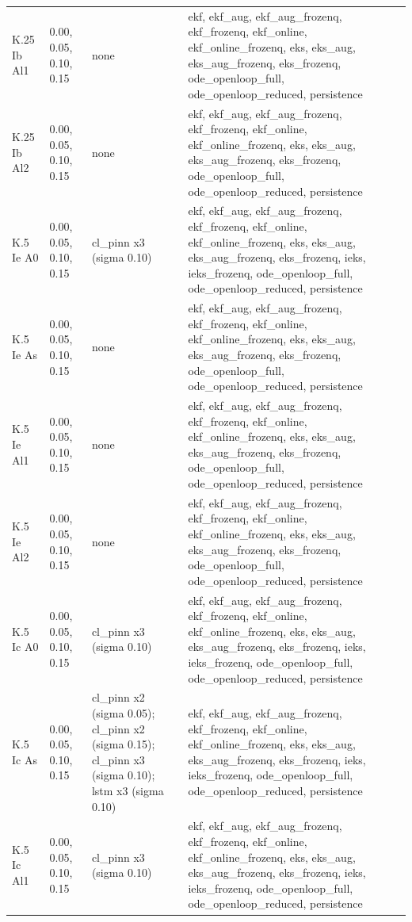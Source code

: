 \begin{table}[t]
\begin{tabular}{llll}
K.25 Ib Al1 & 0.00, 0.05, 0.10, 0.15 & none & ekf, ekf\_aug, ekf\_aug\_frozenq, ekf\_frozenq, ekf\_online, ekf\_online\_frozenq, eks, eks\_aug, eks\_aug\_frozenq, eks\_frozenq, ode\_openloop\_full, ode\_openloop\_reduced, persistence \\
K.25 Ib Al2 & 0.00, 0.05, 0.10, 0.15 & none & ekf, ekf\_aug, ekf\_aug\_frozenq, ekf\_frozenq, ekf\_online, ekf\_online\_frozenq, eks, eks\_aug, eks\_aug\_frozenq, eks\_frozenq, ode\_openloop\_full, ode\_openloop\_reduced, persistence \\
K.5 Ie A0 & 0.00, 0.05, 0.10, 0.15 & cl\_pinn x3 (sigma 0.10) & ekf, ekf\_aug, ekf\_aug\_frozenq, ekf\_frozenq, ekf\_online, ekf\_online\_frozenq, eks, eks\_aug, eks\_aug\_frozenq, eks\_frozenq, ieks, ieks\_frozenq, ode\_openloop\_full, ode\_openloop\_reduced, persistence \\
K.5 Ie As & 0.00, 0.05, 0.10, 0.15 & none & ekf, ekf\_aug, ekf\_aug\_frozenq, ekf\_frozenq, ekf\_online, ekf\_online\_frozenq, eks, eks\_aug, eks\_aug\_frozenq, eks\_frozenq, ode\_openloop\_full, ode\_openloop\_reduced, persistence \\
K.5 Ie Al1 & 0.00, 0.05, 0.10, 0.15 & none & ekf, ekf\_aug, ekf\_aug\_frozenq, ekf\_frozenq, ekf\_online, ekf\_online\_frozenq, eks, eks\_aug, eks\_aug\_frozenq, eks\_frozenq, ode\_openloop\_full, ode\_openloop\_reduced, persistence \\
K.5 Ie Al2 & 0.00, 0.05, 0.10, 0.15 & none & ekf, ekf\_aug, ekf\_aug\_frozenq, ekf\_frozenq, ekf\_online, ekf\_online\_frozenq, eks, eks\_aug, eks\_aug\_frozenq, eks\_frozenq, ode\_openloop\_full, ode\_openloop\_reduced, persistence \\
K.5 Ic A0 & 0.00, 0.05, 0.10, 0.15 & cl\_pinn x3 (sigma 0.10) & ekf, ekf\_aug, ekf\_aug\_frozenq, ekf\_frozenq, ekf\_online, ekf\_online\_frozenq, eks, eks\_aug, eks\_aug\_frozenq, eks\_frozenq, ieks, ieks\_frozenq, ode\_openloop\_full, ode\_openloop\_reduced, persistence \\
K.5 Ic As & 0.00, 0.05, 0.10, 0.15 & cl\_pinn x2 (sigma 0.05); cl\_pinn x2 (sigma 0.15); cl\_pinn x3 (sigma 0.10); lstm x3 (sigma 0.10) & ekf, ekf\_aug, ekf\_aug\_frozenq, ekf\_frozenq, ekf\_online, ekf\_online\_frozenq, eks, eks\_aug, eks\_aug\_frozenq, eks\_frozenq, ieks, ieks\_frozenq, ode\_openloop\_full, ode\_openloop\_reduced, persistence \\
K.5 Ic Al1 & 0.00, 0.05, 0.10, 0.15 & cl\_pinn x3 (sigma 0.10) & ekf, ekf\_aug, ekf\_aug\_frozenq, ekf\_frozenq, ekf\_online, ekf\_online\_frozenq, eks, eks\_aug, eks\_aug\_frozenq, eks\_frozenq, ieks, ieks\_frozenq, ode\_openloop\_full, ode\_openloop\_reduced, persistence \\

\end{tabular}
\end{table}
